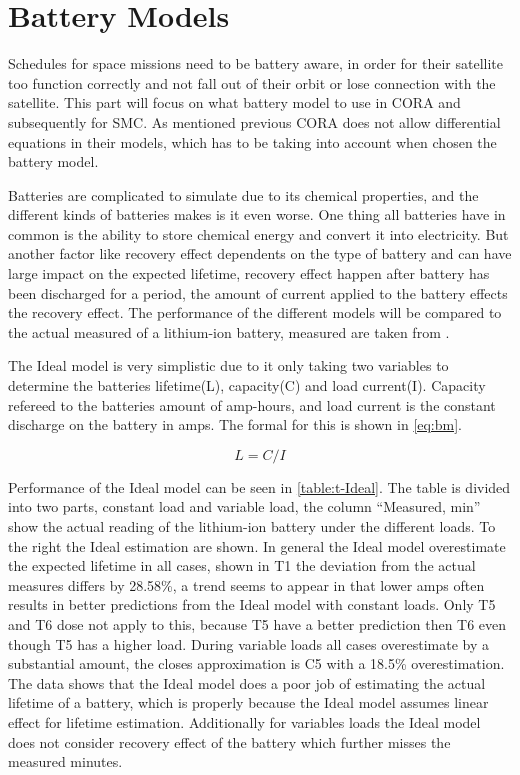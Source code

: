 \section{Battery Models}\label{sec:kibam}
Schedules for space missions need to be battery aware, in order for their satellite too function correctly and not fall out of their orbit or lose connection with the satellite. This part will focus on what battery model to use in CORA and subsequently for SMC. As mentioned previous CORA does not allow differential equations in their models, which has to be taking into account when chosen the battery model.

Batteries are complicated to simulate due to its chemical properties, and the different kinds of batteries makes is it even worse. One thing all batteries have in common is the ability to store chemical energy and convert it into electricity. But another factor like recovery effect dependents on the type of battery and can have large impact on the expected lifetime, recovery effect happen after battery has been discharged for a period, the amount of current applied to the battery effects the recovery effect. The performance of the different models will be compared to the actual measured of a lithium-ion battery, measured are taken from \cite{battery_lifetime_analysis}.

The Ideal model is very simplistic due to it only taking two variables to determine the batteries lifetime(L), capacity(C) and load current(I). Capacity refereed to the batteries amount of amp-hours, and load current is the constant discharge on the battery in amps. The formal for this is shown in \cref{eq:bm}.

\begin{equation}\label{eq:bm}
L=C/I
\end{equation}

Performance of the Ideal model can be seen in \cref{table:t-Ideal}. The table is divided into two parts, constant load and variable load, the column ``Measured, min'' show the actual reading of the lithium-ion battery under the different loads. To the right the Ideal estimation are shown. In general the Ideal model overestimate the expected lifetime in all cases, shown in T1 the deviation from the actual measures differs by 28.58\%, a trend seems to appear in that lower amps often results in better predictions from the Ideal model with constant loads. Only T5 and T6 dose not apply to this, because T5 have a better prediction then T6 even though T5 has a higher load. During variable loads all cases overestimate by a substantial amount, the closes approximation is C5 with a 18.5\% overestimation. The data shows that the Ideal model does a poor job of estimating the actual lifetime of a battery, which is properly because the Ideal model assumes linear effect for lifetime estimation. Additionally for variables loads the Ideal model does not consider recovery effect of the battery which further misses the measured minutes. 

